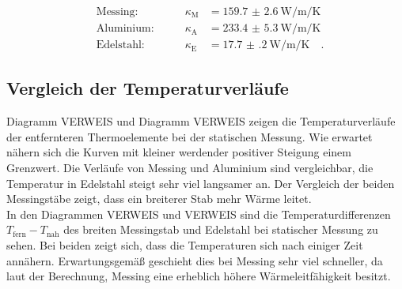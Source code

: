 \begin{align}
	&\text{Messing:}\qquad & \kappa_\text{M} &= \SI{159.7(26)}{\watt\per\metre\per\kelvin} \\
	&\text{Aluminium:}\qquad & \kappa_\text{A} &= \SI{233.4(53)}{\watt\per\metre\per\kelvin} \\
	&\text{Edelstahl:}\qquad & \kappa_\text{E} &= \SI{17.7(2)}{\watt\per\metre\per\kelvin}\quad.
\end{align}


\subsection{Vergleich der Temperaturverläufe}
Diagramm VERWEIS und Diagramm VERWEIS zeigen die Temperaturverläufe der entfernteren Thermoelemente bei der statischen Messung. Wie erwartet nähern sich die Kurven mit kleiner werdender positiver Steigung einem Grenzwert. Die Verläufe von Messing und Aluminium sind vergleichbar, die Temperatur in Edelstahl steigt sehr viel langsamer an. Der Vergleich der beiden Messingstäbe zeigt, dass ein breiterer Stab mehr Wärme leitet. \\
In den Diagrammen VERWEIS und VERWEIS sind die Temperaturdifferenzen $T_\text{fern}-T_\text{nah}$ des breiten Messingstab und Edelstahl bei statischer Messung zu sehen. Bei beiden zeigt sich, dass die Temperaturen sich nach einiger Zeit annähern. Erwartungsgemäß geschieht dies bei Messing sehr viel schneller, da laut der Berechnung, Messing eine erheblich höhere Wärmeleitfähigkeit besitzt.
